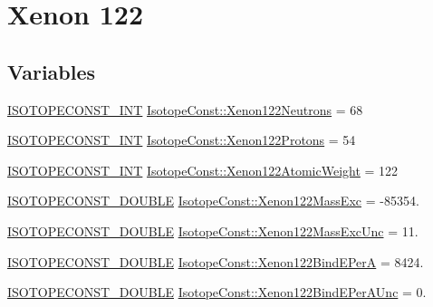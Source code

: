 \hypertarget{group___isotope_const-_xenon-_xe122}{}\section{Xenon 122}
\label{group___isotope_const-_xenon-_xe122}
\subsection*{Variables}
\begin{DoxyCompactItemize}
\item 
\mbox{\hyperlink{group___isotope_const-_macros_ga5f18360b3e99483a35c32d789e62621c}{I\+S\+O\+T\+O\+P\+E\+C\+O\+N\+S\+T\+\_\+\+I\+NT}} \mbox{\hyperlink{group___isotope_const-_xenon-_xe122_gae45d844a71c6b7e9bed7dce47a338781}{Isotope\+Const\+::\+Xenon122\+Neutrons}} = 68
\item 
\mbox{\hyperlink{group___isotope_const-_macros_ga5f18360b3e99483a35c32d789e62621c}{I\+S\+O\+T\+O\+P\+E\+C\+O\+N\+S\+T\+\_\+\+I\+NT}} \mbox{\hyperlink{group___isotope_const-_xenon-_xe122_gab2b996c7f0d35071b18e841fe5958f21}{Isotope\+Const\+::\+Xenon122\+Protons}} = 54
\item 
\mbox{\hyperlink{group___isotope_const-_macros_ga5f18360b3e99483a35c32d789e62621c}{I\+S\+O\+T\+O\+P\+E\+C\+O\+N\+S\+T\+\_\+\+I\+NT}} \mbox{\hyperlink{group___isotope_const-_xenon-_xe122_ga6d685594ebdb15dac9991408bb4ec1a7}{Isotope\+Const\+::\+Xenon122\+Atomic\+Weight}} = 122
\item 
\mbox{\hyperlink{group___isotope_const-_macros_ga8f45a7272ce02c0b4c65c44636ed719a}{I\+S\+O\+T\+O\+P\+E\+C\+O\+N\+S\+T\+\_\+\+D\+O\+U\+B\+LE}} \mbox{\hyperlink{group___isotope_const-_xenon-_xe122_gad9afc20a63c7149858a49a51b3056245}{Isotope\+Const\+::\+Xenon122\+Mass\+Exc}} = -\/85354.
\item 
\mbox{\hyperlink{group___isotope_const-_macros_ga8f45a7272ce02c0b4c65c44636ed719a}{I\+S\+O\+T\+O\+P\+E\+C\+O\+N\+S\+T\+\_\+\+D\+O\+U\+B\+LE}} \mbox{\hyperlink{group___isotope_const-_xenon-_xe122_ga75884e5b962f3286aebd1469385541ca}{Isotope\+Const\+::\+Xenon122\+Mass\+Exc\+Unc}} = 11.
\item 
\mbox{\hyperlink{group___isotope_const-_macros_ga8f45a7272ce02c0b4c65c44636ed719a}{I\+S\+O\+T\+O\+P\+E\+C\+O\+N\+S\+T\+\_\+\+D\+O\+U\+B\+LE}} \mbox{\hyperlink{group___isotope_const-_xenon-_xe122_ga9b6ac4055fdade6b6fb7506778738097}{Isotope\+Const\+::\+Xenon122\+Bind\+E\+PerA}} = 8424.
\item 
\mbox{\hyperlink{group___isotope_const-_macros_ga8f45a7272ce02c0b4c65c44636ed719a}{I\+S\+O\+T\+O\+P\+E\+C\+O\+N\+S\+T\+\_\+\+D\+O\+U\+B\+LE}} \mbox{\hyperlink{group___isotope_const-_xenon-_xe122_ga26acb7954b8302f8f713009949109597}{Isotope\+Const\+::\+Xenon122\+Bind\+E\+Per\+A\+Unc}} = 0.

\end{DoxyCompactItemize}
